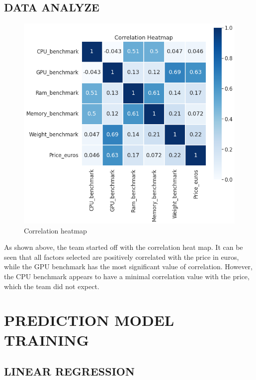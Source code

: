 \documentclass{scrartcl}
\begin{document}
\subsection{DATA ANALYZE}

\begin{figure}[H]
	\begin{center}
		\includegraphics[scale=0.4]{Graphics/4520 final/Heat_map.png}
	\end{center}
	\caption{Correlation heatmap}
	\label{fig:heat}
\end{figure}

As shown above, the team started off with the correlation heat map. It can be seen that all factors selected are positively correlated with the price in euros, while the GPU benchmark has the most significant value of correlation. However, the CPU benchmark appears to have a minimal correlation value with the price, which the team did not expect. 

\section{PREDICTION MODEL TRAINING}

\subsection{LINEAR REGRESSION}
\end{document}
